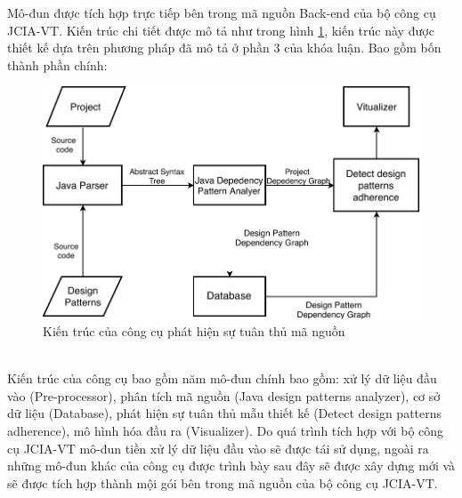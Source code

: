 \documentclass[12pt]{report}
\begin{document}
\noindent Mô-đun được tích hợp trực tiếp bên trong mã nguồn Back-end của bộ công cụ JCIA-VT. Kiến trúc chi tiết được mô tả như trong hình \ref{fig:detect_design_pattern_architexture}, kiến trúc này được thiết kế dựa trên phương pháp đã mô tả ở phần 3 của khóa luận. Bao gồm bốn thành phần chính:
\begin{figure}[!htbp]
	\centering
	\includegraphics[scale=1.09]{images/c4_architexture.pdf}
	\caption{Kiến trúc của công cụ phát hiện sự tuân thủ mã nguồn}
	\label{fig:detect_design_pattern_architexture}
\end{figure}\\
Kiến trúc của công cụ bao gồm năm mô-đun chính bao gồm: xử lý dữ liệu đầu vào (Pre-processor), phân tích mã nguồn (Java design patterns analyzer), cơ sở dữ liệu (Database), phát hiện sự tuân thủ mẫu thiết kế (Detect design patterns adherence), mô hình hóa đầu ra (Visualizer). Do quá trình tích hợp với bộ công cụ JCIA-VT mô-đun tiền xử lý dữ liệu đầu vào sẽ được tái sử dụng, ngoài ra những mô-đun khác của công cụ được trình bày sau đây sẽ được xây dựng mới và sẽ được tích hợp thành mội gói bên trong mã nguồn của bộ công cụ  JCIA-VT.
\end{document}
